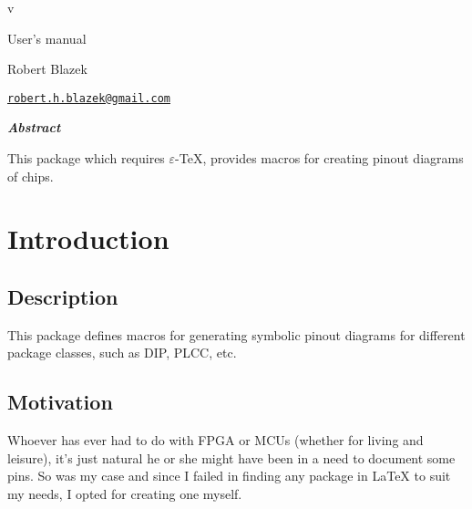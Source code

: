 \documentclass[english,a4paper,10pt]{article}
\begin{document}
\setlength{\parindent}{0pt}
\begin{titlepage}
	\null\par\vfill
	\begin{center}
		\begin{minipage}{0.75\linewidth}
			\begin{center}
				\Huge\bfseries \pinoutikzname\par\vspace{5pt}
				\small v\pinoutikzversion\par\vspace{25pt}
				\normalsize User's manual
			\end{center}
		\end{minipage}
	\end{center}
	\vspace{1cm}
	\begin{center}
		Robert {\sc Blazek}\par\small
		\href{mailto:robert.h.blazek@gmail.com}{\nolinkurl{robert.h.blazek@gmail.com}}\par\vspace{5pt}
	\end{center}
	\vfill\hrulefill
	\begin{center}
		\begin{minipage}{0.85\linewidth}
			\noindent
			\hfill\textbf{\textit{Abstract}}\hfill{}\medskip\par
			This package which requires $\varepsilon$-\TeX{}, provides macros for creating pinout diagrams of chips. 

		\end{minipage}
	\end{center}
	\hrulefill\vfill{}
\end{titlepage}

\tableofcontents

\section{Introduction}
\subsection{Description}
This package defines macros for generating symbolic pinout diagrams for different package classes, such as DIP, PLCC, etc.

\subsection{Motivation}
Whoever has ever had to do with FPGA or MCUs (whether for living and leisure), it's just natural he or she might have been in a need to document some pins. So was my case and since I failed in finding any package in \LaTeX{} to suit my needs, I opted for creating one myself.
\end{document}
